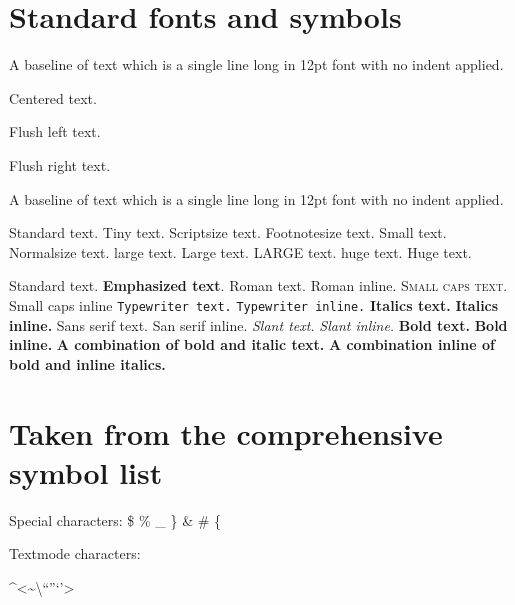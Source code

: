 \documentclass[12pt,a4paper]{article}
\renewcommand{\textit}{\textbf}
\renewcommand{\emph}{\textbf}
\renewcommand{\it}{\bf }
\begin{document}

\section{Standard fonts and symbols}

\noindent
A baseline of text which is a single line long in 12pt font with no indent applied.

\begin{center}
Centered text.
\end{center}

\begin{flushleft}
Flush left text.
\end{flushleft}

\begin{flushright}
Flush right text.
\end{flushright}

\noindent
A baseline of text which is a single line long in 12pt font with no indent applied.

Standard text. {\tiny Tiny text.} {\scriptsize Scriptsize text.} {\footnotesize Footnotesize text.} {\small Small text.} {\normalsize Normalsize text.} {\large large text.} {\Large Large text.} {\LARGE LARGE text.} {\huge huge text.} {\Huge Huge text.}

Standard text. \emph{Emphasized text}. \textrm{Roman text.} {\rm Roman inline.} \textsc{Small caps text.} {\sc Small caps inline} \texttt{Typewriter text.} {\tt Typewriter inline.} \textit{Italics text.} {\it Italics inline.} \textsf{Sans serif text.} {\sf San serif inline.} \textsl{Slant text.} {\sl Slant inline.}  \textbf{Bold text.} {\bf Bold inline.} \textbf{A combination of bold and \textit{italic text.}} {\bf A combination inline of bold {\it and inline italics}.}

\newpage

\section{Taken from the comprehensive symbol list}

\noindent
Special characters: \$  \%  \_  \}  \&  \#  \{

\noindent
Textmode characters: 
\par\noindent
\textasciicircum  \textless  \textasciitilde  \textordfeminine    \textasteriskcentered  \textordmasculine  \textbackslash  \textparagraph  \textbar  \textperiodcentered  \textbraceleft  \textquestiondown  \textbraceright  \textquotedblleft  \textbullet  \textquotedblright  \textcopyright  \textquoteleft  \textdagger  \textquoteright  \textdaggerdbl  \textregistered  \textdollar  \textsection  \textellipsis  \textsterling  \textemdash  \texttrademark  \textendash  \textunderscore  \textexclamdown  \textvisiblespace  \textgreater                                                      
\end{document}
